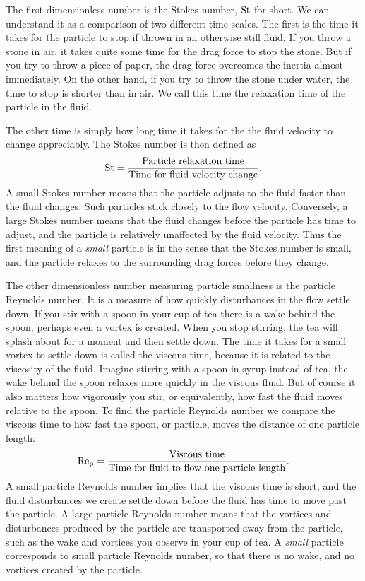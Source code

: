 \documentclass[thesis.tex]{subfiles}
\begin{document}
The first dimensionless number is the Stokes number, $\mbox{St}$ for short. We can understand it as a comparison of two different time scales. The first is the time it takes for the particle to stop if thrown in an otherwise still fluid. If you throw a stone in air, it takes quite some time for the drag force to stop the stone. But if you try to throw a piece of paper, the drag force overcomes the inertia almost immediately. On the other hand, if you try to throw the stone under water, the time to stop is shorter than in air. We call this time the relaxation time of the particle in the fluid. 

The other time is simply how long time it takes for the the fluid velocity to change appreciably. The Stokes number is then defined as
\begin{align*}
    \mbox{St} = \frac{\textrm{Particle relaxation time}}{\textrm{Time for fluid velocity change}}.
 \end{align*} 
A small Stokes number means that the particle adjusts to the fluid faster than the fluid changes. Such particles stick closely to the flow velocity. Conversely, a large Stokes number means that the fluid changes before the particle has time to adjust, and the particle is relatively unaffected by the fluid velocity. Thus the first meaning of a \emph{small} particle is in the sense that the Stokes number is small, and the particle relaxes to the surrounding drag forces before they change.

The other dimensionless number measuring particle smallness is the particle Reynolds number. It is a measure of how quickly disturbances in the flow settle down. If you stir with a spoon in your cup of tea there is a wake behind the spoon, perhaps even a vortex is created. When you stop stirring, the tea will splash about for a moment and then settle down. The time it takes for a small vortex to settle down is called the viscous time, because it is related to the viscosity of the fluid. Imagine stirring with a spoon in syrup instead of tea, the wake behind the spoon relaxes more quickly in the viscous fluid. But of course it also matters how vigorously you stir, or equivalently, how fast the fluid moves relative to the spoon. To find the particle Reynolds number we compare the viscous time to how fast the spoon, or particle, moves the distance of one particle length:
\begin{align*}
    \mbox{Re}_{\mathrm p} = \frac{\textrm{Viscous time}}{\textrm{Time for fluid to flow one particle length}}.
 \end{align*} 
A small particle Reynolds number implies that the viscous time is short, and the fluid disturbances we create settle down before the fluid has time to move past the particle. A large particle Reynolds number means that the vortices and disturbances produced by the particle are transported away from the particle, such as the wake and vortices you observe in your cup of tea. A \emph{small} particle corresponds to small particle Reynolds number, so that there is no wake, and no vortices created by the particle. 
\end{document}
